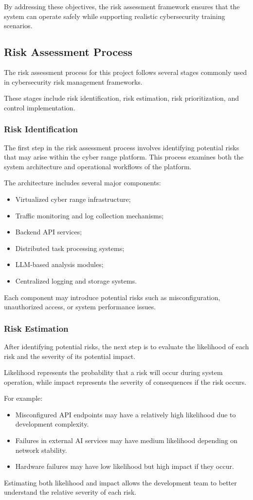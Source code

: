 By addressing these objectives, the risk assessment framework ensures that the system can operate safely while supporting realistic cybersecurity training scenarios.

\subsection{Risk Assessment Process}
The risk assessment process for this project follows several stages commonly used in cybersecurity risk management frameworks.

These stages include risk identification, risk estimation, risk prioritization, and control implementation.

\subsubsection{Risk Identification}
The first step in the risk assessment process involves identifying potential risks that may arise within the cyber range platform. This process examines both the system architecture and operational workflows of the platform.

The architecture includes several major components:
\begin{itemize}
    \item Virtualized cyber range infrastructure;
    \item Traffic monitoring and log collection mechanisms;
    \item Backend API services;
    \item Distributed task processing systems;
    \item LLM-based analysis modules;
    \item Centralized logging and storage systems.
\end{itemize}
Each component may introduce potential risks such as misconfiguration, unauthorized access, or system performance issues.

\subsubsection{Risk Estimation}
After identifying potential risks, the next step is to evaluate the likelihood of each risk and the severity of its potential impact.

Likelihood represents the probability that a risk will occur during system operation, while impact represents the severity of consequences if the risk occurs.

For example:
\begin{itemize}
    \item Misconfigured API endpoints may have a relatively high likelihood due to development complexity.
    \item Failures in external AI services may have medium likelihood depending on network stability.
    \item Hardware failures may have low likelihood but high impact if they occur.
\end{itemize}
Estimating both likelihood and impact allows the development team to better understand the relative severity of each risk.

